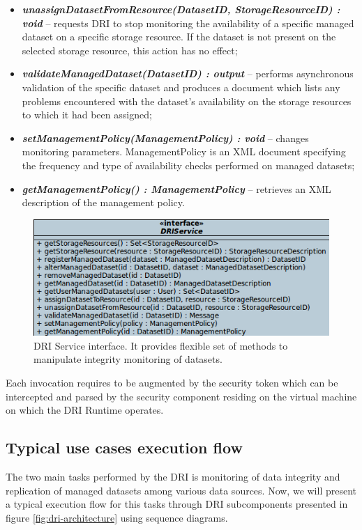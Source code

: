 \begin{itemize}
	\item \textbf{\textit{unassignDatasetFromResource(DatasetID, 
	StorageResourceID) : void}} -- requests DRI to stop monitoring the 
	availability of a specific managed dataset on a specific storage resource.
	If the dataset is not present on the selected storage resource, this action
	has no effect;
	
	\item \textbf{\textit{validateManagedDataset(DatasetID) : output}} --
	performs asynchronous validation of the specific dataset and produces a
	document which lists any problems encountered with the dataset's
	availability on the storage resources to which it had been assigned;
	
	\item \textbf{\textit{setManagementPolicy(ManagementPolicy) : void}} --
	changes monitoring parameters. ManagementPolicy is an XML document
	specifying the frequency and type of availability checks performed on
	managed datasets;
	
	\item \textbf{\textit{getManagementPolicy() : ManagementPolicy}} --
	retrieves an XML description of the management policy.
\end{itemize}

\begin{figure}[h!]
	\centering
	\includegraphics[width=\textwidth]{images/dri-interface.png}
	\caption{DRI Service interface. It provides flexible set of methods to
	manipulate integrity monitoring of datasets.}
	\label{fig:dri-interface}
\end{figure}

Each invocation requires to be augmented by the security token which can be
intercepted and parsed by the security component residing on the virtual
machine on which the DRI Runtime operates.

		\subsection{Typical use cases execution flow}
The two main tasks performed by the DRI is monitoring of data integrity and
replication of managed datasets among various data sources. Now, we will
present a typical execution flow for this tasks through DRI subcomponents
presented in figure \ref{fig:dri-architecture} using sequence diagrams.\\


